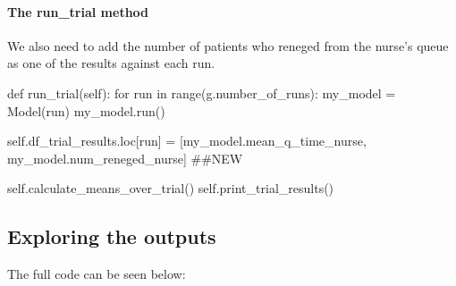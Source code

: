 \documentclass[
  letterpaper,
  DIV=11,
  numbers=noendperiod]{scrreprt}
\let\oldparagraph\paragraph
\renewcommand{\paragraph}[1]{\oldparagraph{#1}\mbox{}}
\newenvironment{Shaded}{\begin{snugshade}}{\end{snugshade}}
\newcommand{\BuiltInTok}[1]{\textcolor[rgb]{0.00,0.23,0.31}{#1}}
\newcommand{\CommentTok}[1]{\textcolor[rgb]{0.37,0.37,0.37}{#1}}
\newcommand{\ControlFlowTok}[1]{\textcolor[rgb]{0.00,0.23,0.31}{#1}}
\newcommand{\KeywordTok}[1]{\textcolor[rgb]{0.00,0.23,0.31}{#1}}
\newcommand{\NormalTok}[1]{\textcolor[rgb]{0.00,0.23,0.31}{#1}}
\newcommand{\OperatorTok}[1]{\textcolor[rgb]{0.37,0.37,0.37}{#1}}
\newcommand{\VariableTok}[1]{\textcolor[rgb]{0.07,0.07,0.07}{#1}}
\begin{document}
\paragraph{The run\_trial method}\label{the-run_trial-method-1}

We also need to add the number of patients who reneged from the nurse's
queue as one of the results against each run.

\begin{Shaded}
\begin{Highlighting}[]
\KeywordTok{def}\NormalTok{ run\_trial(}\VariableTok{self}\NormalTok{):}
    \ControlFlowTok{for}\NormalTok{ run }\KeywordTok{in} \BuiltInTok{range}\NormalTok{(g.number\_of\_runs):}
\NormalTok{        my\_model }\OperatorTok{=}\NormalTok{ Model(run)}
\NormalTok{        my\_model.run()}


        \VariableTok{self}\NormalTok{.df\_trial\_results.loc[run] }\OperatorTok{=}\NormalTok{ [my\_model.mean\_q\_time\_nurse,}
\NormalTok{                                            my\_model.num\_reneged\_nurse] }\CommentTok{\#\#NEW}

    \VariableTok{self}\NormalTok{.calculate\_means\_over\_trial()}
    \VariableTok{self}\NormalTok{.print\_trial\_results()}
\end{Highlighting}
\end{Shaded}

\subsection{Exploring the outputs}\label{exploring-the-outputs}

The full code can be seen below:
\end{document}
